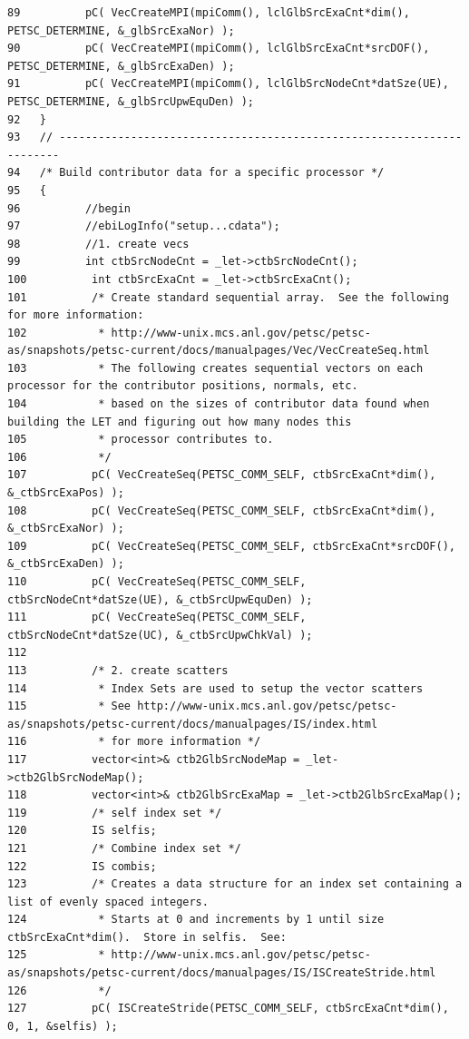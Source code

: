 \begin{verbatim}
89          pC( VecCreateMPI(mpiComm(), lclGlbSrcExaCnt*dim(),         PETSC_DETERMINE, &_glbSrcExaNor) );  
90          pC( VecCreateMPI(mpiComm(), lclGlbSrcExaCnt*srcDOF(),        PETSC_DETERMINE, &_glbSrcExaDen) );
91          pC( VecCreateMPI(mpiComm(), lclGlbSrcNodeCnt*datSze(UE),  PETSC_DETERMINE, &_glbSrcUpwEquDen) );
92   }
93   // ----------------------------------------------------------------------
94   /* Build contributor data for a specific processor */
95   {
96          //begin
97          //ebiLogInfo("setup...cdata");
98          //1. create vecs
99          int ctbSrcNodeCnt = _let->ctbSrcNodeCnt();
100          int ctbSrcExaCnt = _let->ctbSrcExaCnt();
101          /* Create standard sequential array.  See the following for more information:
102           * http://www-unix.mcs.anl.gov/petsc/petsc-as/snapshots/petsc-current/docs/manualpages/Vec/VecCreateSeq.html
103           * The following creates sequential vectors on each processor for the contributor positions, normals, etc.
104           * based on the sizes of contributor data found when building the LET and figuring out how many nodes this
105           * processor contributes to.
106           */
107          pC( VecCreateSeq(PETSC_COMM_SELF, ctbSrcExaCnt*dim(),  &_ctbSrcExaPos) );
108          pC( VecCreateSeq(PETSC_COMM_SELF, ctbSrcExaCnt*dim(),  &_ctbSrcExaNor) );
109          pC( VecCreateSeq(PETSC_COMM_SELF, ctbSrcExaCnt*srcDOF(), &_ctbSrcExaDen) );
110          pC( VecCreateSeq(PETSC_COMM_SELF, ctbSrcNodeCnt*datSze(UE), &_ctbSrcUpwEquDen) );
111          pC( VecCreateSeq(PETSC_COMM_SELF, ctbSrcNodeCnt*datSze(UC), &_ctbSrcUpwChkVal) );
112   
113          /* 2. create scatters
114           * Index Sets are used to setup the vector scatters
115           * See http://www-unix.mcs.anl.gov/petsc/petsc-as/snapshots/petsc-current/docs/manualpages/IS/index.html
116           * for more information */
117          vector<int>& ctb2GlbSrcNodeMap = _let->ctb2GlbSrcNodeMap();
118          vector<int>& ctb2GlbSrcExaMap = _let->ctb2GlbSrcExaMap();
119          /* self index set */
120          IS selfis;
121          /* Combine index set */
122          IS combis;
123          /* Creates a data structure for an index set containing a list of evenly spaced integers.
124           * Starts at 0 and increments by 1 until size ctbSrcExaCnt*dim().  Store in selfis.  See:
125           * http://www-unix.mcs.anl.gov/petsc/petsc-as/snapshots/petsc-current/docs/manualpages/IS/ISCreateStride.html
126           */
127          pC( ISCreateStride(PETSC_COMM_SELF, ctbSrcExaCnt*dim(), 0, 1, &selfis) );

\end{verbatim}

